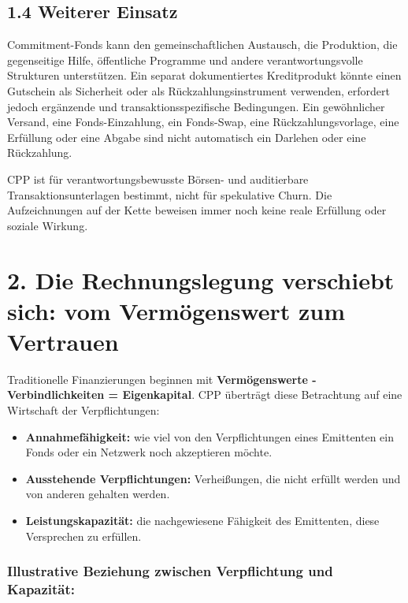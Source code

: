 \documentclass[11pt]{article}
\begin{document}
\subsection*{1.4 Weiterer Einsatz}

Commitment-Fonds kann den gemeinschaftlichen Austausch, die Produktion, die gegenseitige Hilfe, öffentliche Programme und andere verantwortungsvolle Strukturen unterstützen. Ein separat dokumentiertes Kreditprodukt könnte einen Gutschein als Sicherheit oder als Rückzahlungsinstrument verwenden, erfordert jedoch ergänzende und transaktionsspezifische Bedingungen. Ein gewöhnlicher Versand, eine Fonds-Einzahlung, ein Fonds-Swap, eine Rückzahlungsvorlage, eine Erfüllung oder eine Abgabe sind nicht automatisch ein Darlehen oder eine Rückzahlung.

CPP ist für verantwortungsbewusste Börsen- und auditierbare Transaktionsunterlagen bestimmt, nicht für spekulative Churn. Die Aufzeichnungen auf der Kette beweisen immer noch keine reale Erfüllung oder soziale Wirkung.


\section*{2. Die Rechnungslegung verschiebt sich: vom Vermögenswert zum Vertrauen}

Traditionelle Finanzierungen beginnen mit \textbf{Vermögenswerte - Verbindlichkeiten = Eigenkapital}. CPP überträgt diese Betrachtung auf eine Wirtschaft der Verpflichtungen:

\begin{itemize}[leftmargin=*]
\item \textbf{Annahmefähigkeit:} wie viel von den Verpflichtungen eines Emittenten ein Fonds oder ein Netzwerk noch akzeptieren möchte.
\item \textbf{Ausstehende Verpflichtungen:} Verheißungen, die nicht erfüllt werden und von anderen gehalten werden.
\item \textbf{Leistungskapazität:} die nachgewiesene Fähigkeit des Emittenten, diese Versprechen zu erfüllen.
\end{itemize}
\subsubsection*{Illustrative Beziehung zwischen Verpflichtung und Kapazität:}
\end{document}
